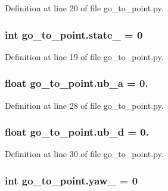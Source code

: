 Definition at line 20 of file go\+\_\+to\+\_\+point.\+py.

\subsubsection[{\texorpdfstring{state\+\_\+}{state_}}]{\setlength{\rightskip}{0pt plus 5cm}int go\+\_\+to\+\_\+point.\+state\+\_\+ = 0}\hypertarget{namespacego__to__point_aa2d0ef255bcf5d5faf9ca2764730fb17}{}\label{namespacego__to__point_aa2d0ef255bcf5d5faf9ca2764730fb17}


Definition at line 19 of file go\+\_\+to\+\_\+point.\+py.

\subsubsection[{\texorpdfstring{ub\+\_\+a}{ub_a}}]{\setlength{\rightskip}{0pt plus 5cm}float go\+\_\+to\+\_\+point.\+ub\+\_\+a = 0.}\hypertarget{namespacego__to__point_acb4e14986fafe5cb73bb8ad0c178869d}{}\label{namespacego__to__point_acb4e14986fafe5cb73bb8ad0c178869d}


Definition at line 28 of file go\+\_\+to\+\_\+point.\+py.

\subsubsection[{\texorpdfstring{ub\+\_\+d}{ub_d}}]{\setlength{\rightskip}{0pt plus 5cm}float go\+\_\+to\+\_\+point.\+ub\+\_\+d = 0.}\hypertarget{namespacego__to__point_a16c473b9e717200c483d18e66b48152a}{}\label{namespacego__to__point_a16c473b9e717200c483d18e66b48152a}


Definition at line 30 of file go\+\_\+to\+\_\+point.\+py.

\subsubsection[{\texorpdfstring{yaw\+\_\+}{yaw_}}]{\setlength{\rightskip}{0pt plus 5cm}int go\+\_\+to\+\_\+point.\+yaw\+\_\+ = 0}\hypertarget{namespacego__to__point_ae444f19eb2019982432760ace036ce03}{}\label{namespacego__to__point_ae444f19eb2019982432760ace036ce03}


